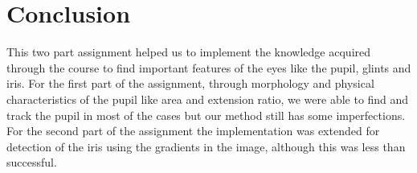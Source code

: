 \section{Conclusion}
This two part assignment helped us to implement the knowledge acquired through the course to find important features of the eyes like the pupil, glints and iris. For the first part of the assignment, through morphology and physical characteristics of the pupil like area and extension ratio, we were able to find and track the pupil in most of the cases but our method still has some imperfections. For the second part of the assignment the implementation was extended for detection of the iris using the gradients in the image, although this was less than successful.\\